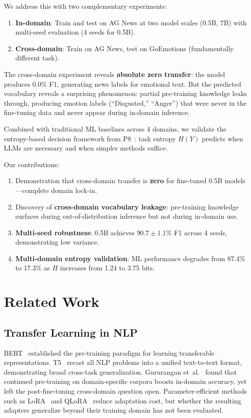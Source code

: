 \documentclass[journal]{IEEEtran}
\begin{document}
We address this with two complementary experiments:
\begin{enumerate}
\item \textbf{In-domain}: Train and test on AG News at two model scales (0.5B, 7B) with multi-seed evaluation (4 seeds for 0.5B).
\item \textbf{Cross-domain}: Train on AG News, test on GoEmotions (fundamentally different task).
\end{enumerate}

The cross-domain experiment reveals \textbf{absolute zero transfer}: the model produces 0.0\% F1, generating news labels for emotional text. But the predicted vocabulary reveals a surprising phenomenon: partial pre-training knowledge leaks through, producing emotion labels (``Disgusted,'' ``Anger'') that were never in the fine-tuning data and never appear during in-domain inference.

Combined with traditional ML baselines across 4 domains, we validate the entropy-based decision framework from P8~\cite{p8}: task entropy $H(Y)$ predicts when LLMs are necessary and when simpler methods suffice.

Our contributions:
\begin{enumerate}
\item Demonstration that cross-domain transfer is \textbf{zero} for fine-tuned 0.5B models---complete domain lock-in.
\item Discovery of \textbf{cross-domain vocabulary leakage}: pre-training knowledge surfaces during out-of-distribution inference but not during in-domain use.
\item \textbf{Multi-seed robustness}: 0.5B achieves $90.7 \pm 1.1$\% F1 across 4 seeds, demonstrating low variance.
\item \textbf{Multi-domain entropy validation}: ML performance degrades from 87.4\% to 17.3\% as $H$ increases from 1.24 to 3.75 bits.
\end{enumerate}

\section{Related Work}

\subsection{Transfer Learning in NLP}
BERT~\cite{devlin2019} established the pre-training paradigm for learning transferable representations. T5~\cite{raffel2020} recast all NLP problems into a unified text-to-text format, demonstrating broad cross-task generalization. Gururangan et~al.~\cite{gururangan2020} found that continued pre-training on domain-specific corpora boosts in-domain accuracy, yet left the post-fine-tuning cross-domain question open. Parameter-efficient methods such as LoRA~\cite{hu2022} and QLoRA~\cite{dettmers2023} reduce adaptation cost, but whether the resulting adapters generalize beyond their training domain has not been evaluated.
\end{document}
